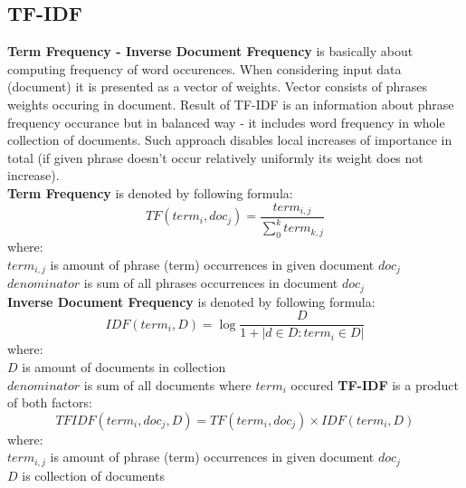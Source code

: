 \subsection{TF-IDF}
\textbf{Term Frequency - Inverse Document Frequency} is basically about computing frequency of word occurences. When considering input data (document) it is presented as a vector of weights. Vector consists of phrases weights occuring in document. Result of TF-IDF is an information about phrase frequency occurance but in balanced way - it includes word frequency in whole collection of documents. Such approach disables local increases of importance in total (if given phrase doesn't occur relatively uniformly its weight does not increase).\\ \textbf{Term Frequency} is denoted by following formula:
\begin{equation} 
TF(term_i,doc_j)=\frac{term_{i,j}}{\sum_{0}^{k}term_{k,j}}
\end{equation}
where:\\
$term_{i,j}$ is amount of phrase (term) occurrences in given document $doc_j$\\ 
$denominator$ is sum of all phrases occurrences in document $doc_j$
\\\newline\textbf{Inverse Document Frequency} is denoted by following formula:
\begin{equation}
IDF(term_i, D) =\log{\frac{D}{1+{|d\in D : term_i \in D|}}}
\end{equation}
where:\\
$D$ is amount of documents in collection\\ 
$denominator$ is sum of all documents where $term_i$ occured
\newline\textbf{TF-IDF} is a product of both factors:
\begin{equation}
TFIDF(term_i, doc_j, D) = TF(term_i,doc_j)\times IDF(term_i,D)
\end{equation}
where:\\
$term_{i,j}$ is amount of phrase (term) occurrences in given document $doc_j$\\
$D$ is collection of documents

